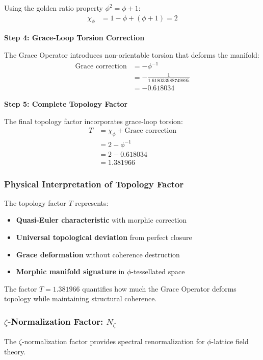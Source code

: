 Using the golden ratio property $\phi^2 = \phi + 1$:
\begin{align}
\chi_\phi &= 1 - \phi + (\phi + 1) = 2
\end{align}

\textbf{Step 4: Grace-Loop Torsion Correction}

The Grace Operator introduces non-orientable torsion that deforms the manifold:
\begin{align}
\text{Grace correction} &= -\phi^{-1} \\
&= -\frac{1}{1.618033988749895} \\
&= -0.618034
\end{align}

\textbf{Step 5: Complete Topology Factor}

The final topology factor incorporates grace-loop torsion:
\begin{align}
T &= \chi_\phi + \text{Grace correction} \\
&= 2 - \phi^{-1} \\
&= 2 - 0.618034 \\
&= 1.381966
\end{align}

\subsubsection{Physical Interpretation of Topology Factor}

The topology factor $T$ represents:

\begin{itemize}
\item \textbf{Quasi-Euler characteristic} with morphic correction
\item \textbf{Universal topological deviation} from perfect closure
\item \textbf{Grace deformation} without coherence destruction
\item \textbf{Morphic manifold signature} in $\phi$-tessellated space
\end{itemize}

The factor $T = 1.381966$ quantifies how much the Grace Operator deforms topology while maintaining structural coherence.

\subsubsection{$\zeta$-Normalization Factor: $N_\zeta$}

The $\zeta$-normalization factor provides spectral renormalization for $\phi$-lattice field theory.

